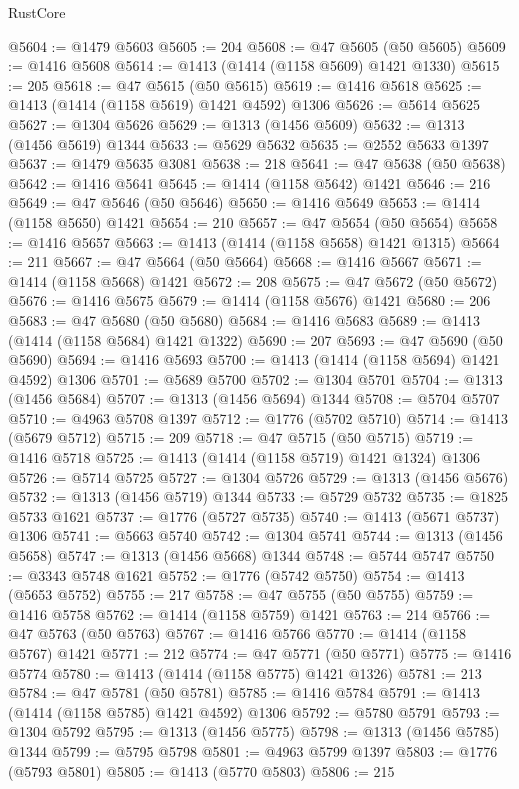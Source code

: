 \begin{lexlean}{RustCore}
\begin{coremodule}
@5604 := @1479 @5603
@5605 := 204
@5608 := @47 @5605 (@50 @5605)
@5609 := @1416 @5608
@5614 := @1413 (@1414 (@1158 @5609) @1421 @1330)
@5615 := 205
@5618 := @47 @5615 (@50 @5615)
@5619 := @1416 @5618
@5625 := @1413 (@1414 (@1158 @5619) @1421 @4592) @1306
@5626 := @5614 @5625
@5627 := @1304 @5626
@5629 := @1313 (@1456 @5609)
@5632 := @1313 (@1456 @5619) @1344
@5633 := @5629 @5632
@5635 := @2552 @5633 @1397
@5637 := @1479 @5635 @3081
@5638 := 218
@5641 := @47 @5638 (@50 @5638)
@5642 := @1416 @5641
@5645 := @1414 (@1158 @5642) @1421
@5646 := 216
@5649 := @47 @5646 (@50 @5646)
@5650 := @1416 @5649
@5653 := @1414 (@1158 @5650) @1421
@5654 := 210
@5657 := @47 @5654 (@50 @5654)
@5658 := @1416 @5657
@5663 := @1413 (@1414 (@1158 @5658) @1421 @1315)
@5664 := 211
@5667 := @47 @5664 (@50 @5664)
@5668 := @1416 @5667
@5671 := @1414 (@1158 @5668) @1421
@5672 := 208
@5675 := @47 @5672 (@50 @5672)
@5676 := @1416 @5675
@5679 := @1414 (@1158 @5676) @1421
@5680 := 206
@5683 := @47 @5680 (@50 @5680)
@5684 := @1416 @5683
@5689 := @1413 (@1414 (@1158 @5684) @1421 @1322)
@5690 := 207
@5693 := @47 @5690 (@50 @5690)
@5694 := @1416 @5693
@5700 := @1413 (@1414 (@1158 @5694) @1421 @4592) @1306
@5701 := @5689 @5700
@5702 := @1304 @5701
@5704 := @1313 (@1456 @5684)
@5707 := @1313 (@1456 @5694) @1344
@5708 := @5704 @5707
@5710 := @4963 @5708 @1397
@5712 := @1776 (@5702 @5710)
@5714 := @1413 (@5679 @5712)
@5715 := 209
@5718 := @47 @5715 (@50 @5715)
@5719 := @1416 @5718
@5725 := @1413 (@1414 (@1158 @5719) @1421 @1324) @1306
@5726 := @5714 @5725
@5727 := @1304 @5726
@5729 := @1313 (@1456 @5676)
@5732 := @1313 (@1456 @5719) @1344
@5733 := @5729 @5732
@5735 := @1825 @5733 @1621
@5737 := @1776 (@5727 @5735)
@5740 := @1413 (@5671 @5737) @1306
@5741 := @5663 @5740
@5742 := @1304 @5741
@5744 := @1313 (@1456 @5658)
@5747 := @1313 (@1456 @5668) @1344
@5748 := @5744 @5747
@5750 := @3343 @5748 @1621
@5752 := @1776 (@5742 @5750)
@5754 := @1413 (@5653 @5752)
@5755 := 217
@5758 := @47 @5755 (@50 @5755)
@5759 := @1416 @5758
@5762 := @1414 (@1158 @5759) @1421
@5763 := 214
@5766 := @47 @5763 (@50 @5763)
@5767 := @1416 @5766
@5770 := @1414 (@1158 @5767) @1421
@5771 := 212
@5774 := @47 @5771 (@50 @5771)
@5775 := @1416 @5774
@5780 := @1413 (@1414 (@1158 @5775) @1421 @1326)
@5781 := 213
@5784 := @47 @5781 (@50 @5781)
@5785 := @1416 @5784
@5791 := @1413 (@1414 (@1158 @5785) @1421 @4592) @1306
@5792 := @5780 @5791
@5793 := @1304 @5792
@5795 := @1313 (@1456 @5775)
@5798 := @1313 (@1456 @5785) @1344
@5799 := @5795 @5798
@5801 := @4963 @5799 @1397
@5803 := @1776 (@5793 @5801)
@5805 := @1413 (@5770 @5803)
@5806 := 215

\end{coremodule}
\end{lexlean}
